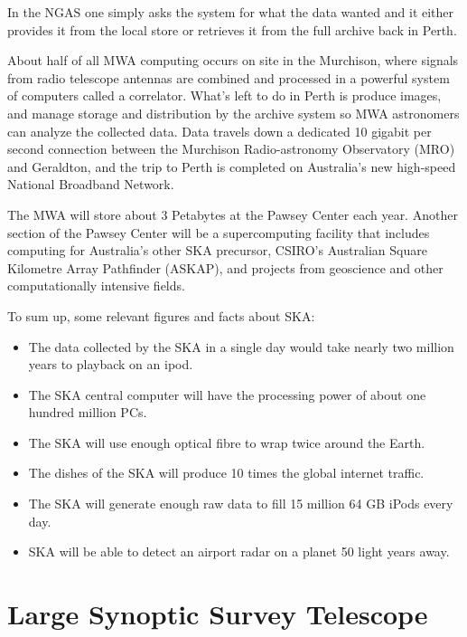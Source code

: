 In the NGAS one simply asks the system for what the data wanted and it either provides it from the local store or retrieves it from the full archive back in Perth. \newline

About half of all MWA computing occurs on site in the Murchison, where signals from radio telescope antennas are combined and processed in a powerful system of computers called a correlator. What's left to do in Perth is produce images, and manage storage and distribution by the archive system so MWA astronomers can analyze the collected data. Data travels down a dedicated 10 gigabit per second connection between the Murchison Radio-astronomy Observatory (MRO) and Geraldton, and the trip to Perth is completed on Australia’s new high-speed National Broadband Network. \newline

The MWA will store about 3 Petabytes at the Pawsey Center each year. Another section of the Pawsey Center will be a supercomputing facility that includes computing for Australia's other SKA precursor, CSIRO’s Australian Square Kilometre Array Pathfinder (ASKAP), and projects from geoscience and other computationally intensive fields. \newline

To sum up, some relevant figures and facts about SKA:

\begin{itemize}

\item The data collected by the SKA in a single day would take nearly two million years to playback on an ipod.
\item The SKA central computer will have the processing power of about one hundred million PCs.
\item The SKA will use enough optical fibre to wrap twice around the Earth.
\item The dishes of the SKA will produce 10 times the global internet traffic.
\item The SKA will generate enough raw data to fill 15 million 64 GB iPods every day.
\item SKA will be able to detect an airport radar on a planet 50 light years away.

\end{itemize}



\section{Large Synoptic Survey Telescope}

